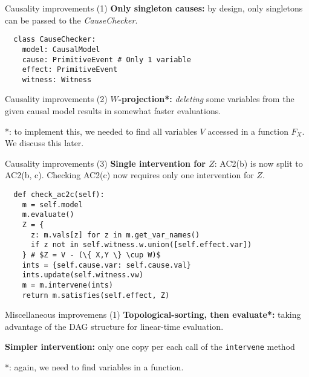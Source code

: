 \documentclass{beamer}
\begin{document}
\begin{frame}[fragile]{Causality improvements (1)}
  \textbf{Only singleton causes:} by design, only singletons can be
  passed to the \emph{CauseChecker}.
  
  \vspace{1.5\baselineskip}
  
  \begin{verbatim}
  class CauseChecker:
    model: CausalModel
    cause: PrimitiveEvent # Only 1 variable
    effect: PrimitiveEvent
    witness: Witness 
  \end{verbatim}

\end{frame}

\begin{frame}{Causality improvements (2)}
  \textbf{$W$-projection*:} \emph{deleting} some variables from the
  given causal model results in somewhat faster evaluations.

  \vspace{1.5\baselineskip}

  *: to implement this, we needed to find all variables $V$ accessed in
  a function $F_X$. We discuss this later.
\end{frame}

\begin{frame}[fragile]{Causality improvements (3)}
  \textbf{Single intervention for $Z$}: AC2(b) is now split to 
  AC2(b, c). Checking AC2(c) now requires only one intervention for 
  $Z$.

  \vspace{1.5\baselineskip}

  \begin{verbatim}
  def check_ac2c(self):
    m = self.model
    m.evaluate()
    Z = {
      z: m.vals[z] for z in m.get_var_names()
      if z not in self.witness.w.union([self.effect.var])
    } # $Z = V - (\{ X,Y \} \cup W)$
    ints = {self.cause.var: self.cause.val}
    ints.update(self.witness.vw)
    m = m.intervene(ints)
    return m.satisfies(self.effect, Z)
  \end{verbatim}
\end{frame}

\begin{frame}{Miscellaneous improvemens (1)}
  \textbf{Topological-sorting, then evaluate*:} taking advantage of the
  DAG structure for linear-time evaluation.

  \vspace{1.5\baselineskip}

  \textbf{Simpler intervention:} only one copy per each call of the
  \texttt{intervene} method

  \vspace{1.5\baselineskip}

  *: again, we need to find variables in a function.
\end{frame}
\end{document}

